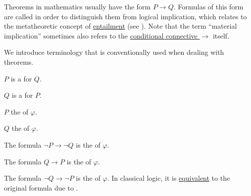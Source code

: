 \begin{definition}\label{def:material_implication}
  Theorems in mathematics usually have the form \( P \rightarrow Q \). Formulas of this form are called  in order to distinguish them from logical implication, which relates to the metatheoretic concept of \hyperref[def:propositional_semantics/entailment]{entailment} (see \cite{MathSE:material_vs_logical_implication}). Note that the term \enquote{material implication} sometimes also refers to the \hyperref[def:propositional_language/connectives/conditional]{conditional connective \( \rightarrow \)} itself.

  We introduce terminology that is conventionally used when dealing with theorems.

  \begin{thmenum}
     \( P \) is a  for \( Q \).

     \( Q \) is a  for \( P \).

     \( P \) the  of \( \varphi \).

     \( Q \) the  of \( \varphi \).

     The formula \( \neg P \rightarrow \neg Q \) is the  of \( \varphi \).

     The formula \( Q \rightarrow P \) is the  of \( \varphi \).

     The formula \( \neg Q \rightarrow \neg P \) is the  of \( \varphi \). In classical logic, it is \hyperref[def:propositional_semantics/equivalence]{equivalent} to the original formula due to .
  \end{thmenum}
\end{definition}

